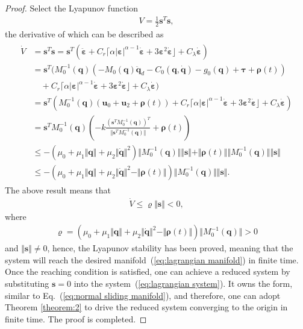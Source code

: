 \documentclass[3p]{elsarticle}
\theoremstyle{plain}
\theoremstyle{remark}
\begin{document}
\begin{proof}
Select the Lyapunov function
\begin{align}
V=\frac{1}{2}\bm s^T\bm s,
\end{align}
the derivative of which can be described as
\begin{align}
\begin{split}
\dot V &= \bm s^T\dot{\bm s}=\bm s^T(\ddot{\bm \varepsilon}+C_r\lceil\alpha\vert\bm\varepsilon\vert^{\alpha-1}\dot{\bm \varepsilon}+3\bm \varepsilon^2\dot{\bm \varepsilon}\rfloor+C_\lambda\dot{\bm \varepsilon})\\
&=\bm s^T(M_0^{-1}(\bm q)(-M_0(\bm q)\ddot {\bm q}_d-C_0(\bm q,\dot {\bm q})-g_0(\bm q)+\bm\tau+\bm\rho(t))\\
&\quad+C_r\lceil\alpha\vert\bm\varepsilon\vert^{\alpha-1}\dot{\bm \varepsilon}+3\bm \varepsilon^2\dot{\bm \varepsilon}\rfloor+C_\lambda\dot{\bm \varepsilon})\\
&=\bm s^T(M_0^{-1}(\bm q)(\bm u_0+\bm u_2+\bm\rho(t))+C_r\lceil\alpha\vert\bm\varepsilon\vert^{\alpha-1}\dot{\bm \varepsilon}+3\bm \varepsilon^2\dot{\bm \varepsilon}\rfloor+C_\lambda\dot{\bm \varepsilon})\\
&=\bm s^TM_0^{-1}(\bm q)(-k\frac{(\bm s^TM_0^{-1}(\bm q))^T}{\Vert\bm s^TM_0^{-1}(\bm q)\Vert}+\bm\rho(t))\\
&\le -(\mu_0+\mu_1\Vert\bm q\Vert+\mu_2\Vert\dot{\bm q}\Vert^2)\Vert M_0^{-1}(\bm q)\Vert\Vert \bm s\Vert+\Vert\bm\rho(t)\Vert\Vert M_0^{-1}(\bm q)\Vert\Vert \bm s\Vert\\
&\le -(\mu_0+\mu_1\Vert\bm q\Vert+\mu_2\Vert\dot{\bm q}\Vert^2-\Vert\bm\rho(t)\Vert)\Vert M_0^{-1}(\bm q)\Vert\Vert \bm s\Vert.
\end{split}
\end{align}
The above result means that
\begin{align}
\dot V \le \varrho\Vert\bm s\Vert<0,
\end{align}
where
\begin{align}
\varrho=(\mu_0+\mu_1\Vert\bm q\Vert+\mu_2\Vert\dot{\bm q}\Vert^2-\Vert\bm\rho(t)\Vert)\Vert M_0^{-1}(\bm q)\Vert>0
\end{align}
and $\Vert\bm s\Vert\neq 0$, hence, the Lyapunov stability has been proved, meaning that the system will reach the desired manifold~(\ref{eq:lagrangian manifold}) in finite time. Once the reaching condition is satisfied, one can achieve a reduced system by substituting $\bm s = 0$ into the system~(\ref{eq:lagrangian system}). It owns the form, similar to Eq.~(\ref{eq:normal sliding manifold}), and therefore, one can adopt Theorem \ref{theorem:2} to drive the reduced system converging to the origin in finite time. The proof is completed.
\end{proof}
\end{document}
